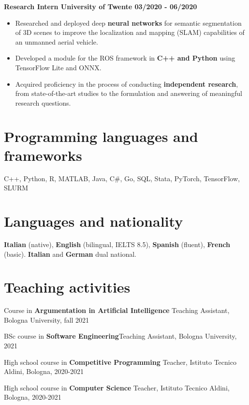 \documentclass[11pt, a4paper]{article}
\begin{document}
\textbf{Research Intern \hfill \hspace{1pt} University of Twente \textbar{} 03/2020 - 06/2020}
\begin{itemize}

\item
  Researched and deployed deep \textbf{neural networks} for semantic
  segmentation of 3D scenes to improve the localization and mapping
  (SLAM) capabilities of an unmanned aerial vehicle.
\item

  Developed a module for the ROS framework in \textbf{C++ and Python}
  using TensorFlow Lite and ONNX.
\item

  Acquired proficiency in the process of conducting \textbf{independent
  research}, from state-of-the-art studies to the formulation and
  answering of meaningful research questions.
\end{itemize}

\section*{Programming languages and frameworks}
C++, Python, R, MATLAB, Java, C\#, Go, SQL, Stata, PyTorch, TensorFlow, SLURM

\section*{Languages and nationality}

 \textbf{Italian} (native), \textbf{English} (bilingual, IELTS 8.5),
  \textbf{Spanish} (fluent), \textbf{French} (basic). \textbf{Italian} and \textbf{German} dual national.

\section*{Teaching activities}

  Course in \textbf{Argumentation in Artificial Intelligence} \hfill Teaching Assistant, Bologna University, fall 2021


  BSc course in \textbf{Software Engineering}\hfill Teaching Assistant, Bologna University, 2021


  High school course in \textbf{Competitive Programming} \hfill Teacher, Istituto Tecnico Aldini, Bologna, 2020-2021


  High school course in \textbf{Computer Science} \hfill Teacher, Istituto
  Tecnico Aldini, Bologna, 2020-2021
\end{document}
